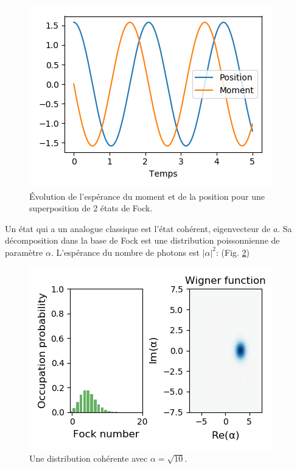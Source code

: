 \documentclass[11pt,a4paper]{article}
\begin{document}
	\begin{figure}
		\centering
		\includegraphics[width=0.7\linewidth]{2Fock_evol_val}
		\caption{Évolution de l'espérance du moment et de la position pour une superposition de 2 états de Fock.}
		\label{fig:2fock_evol_val}
	\end{figure}
		
	
	Un état qui a un analogue classique est l'état cohérent, eigenvecteur de $a$. 
	Sa décomposition dans la base de Fock est une distribution poissonnienne de paramètre $\alpha$. L'espérance du nombre de photons est $|\alpha|^2$: (Fig. \ref{fig:coherent_distr})
	\begin{figure}
		\centering
		\includegraphics[width=0.7\linewidth]{Coherent_distr}
		\caption{Une distribution cohérente avec $\alpha=\sqrt{10}$.}
		\label{fig:coherent_distr}
	\end{figure}
	
\end{document}
